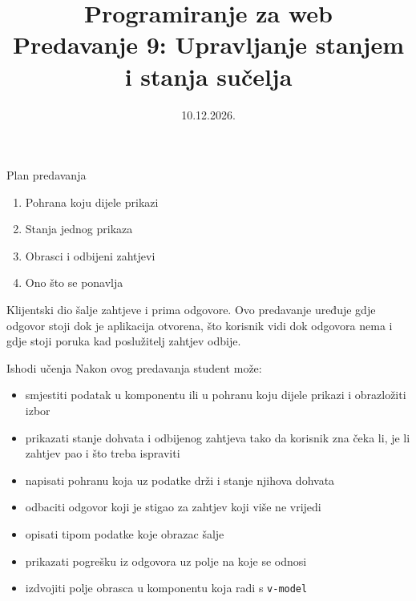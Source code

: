 

\title[Predavanje 9: Upravljanje stanjem]{Programiranje za web \\ Predavanje 9: Upravljanje stanjem i stanja sučelja}
\date{10.12.2026.}



\frame{\titlepage}

\begin{frame}{Plan predavanja}
\begin{enumerate}
  \item Pohrana koju dijele prikazi
  \item Stanja jednog prikaza
  \item Obrasci i odbijeni zahtjevi
  \item Ono što se ponavlja
\end{enumerate}

\vspace{0.6em}
Klijentski dio šalje zahtjeve i prima odgovore. Ovo predavanje uređuje gdje odgovor stoji dok je aplikacija otvorena, što korisnik vidi dok odgovora nema i gdje stoji poruka kad poslužitelj zahtjev odbije.
\end{frame}

\begin{frame}{Ishodi učenja}
Nakon ovog predavanja student može:

\begin{itemize}
  \itemsep0.3em
  \item smjestiti podatak u komponentu ili u pohranu koju dijele prikazi i obrazložiti izbor
  \item prikazati stanje dohvata i odbijenog zahtjeva tako da korisnik zna čeka li, je li zahtjev pao i što treba ispraviti
  \item napisati pohranu koja uz podatke drži i stanje njihova dohvata
  \item odbaciti odgovor koji je stigao za zahtjev koji više ne vrijedi
  \item opisati tipom podatke koje obrazac šalje
  \item prikazati pogrešku iz odgovora uz polje na koje se odnosi
  \item izdvojiti polje obrasca u komponentu koja radi s \texttt{v-model}
\end{itemize}
\end{frame}

